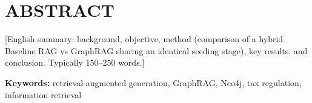 \chapter*{ABSTRACT}

[English summary: background, objective, method (comparison of a hybrid Baseline
RAG vs GraphRAG sharing an identical seeding stage), key results, and conclusion.
Typically 150--250 words.]

\vspace{0.5cm}
\noindent\textbf{Keywords:} retrieval-augmented generation, GraphRAG, Neo4j,
tax regulation, information retrieval
